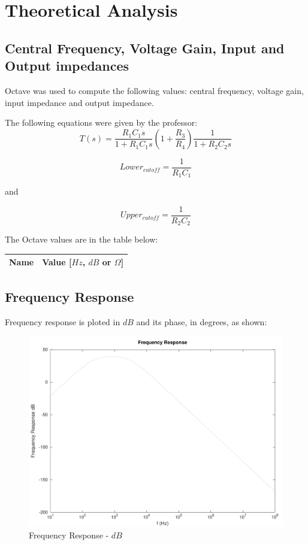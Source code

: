 \newpage

\section{Theoretical Analysis}
\label{sec:analysis}

\subsection{Central Frequency, Voltage Gain, Input and Output impedances}
Octave was used to compute the following values: central frequency, voltage gain, input impedance and output impedance. \par
The following equations were given by the professor:
\begin{equation}
    T(s) = \frac{R_1 C_1 s}{1+ R_1 C_1 s} (1+\frac{R_3}{R_4}) \frac{1}{1+ R_2 C_2 s}
\end{equation}\par
 \par
\begin{equation}
    Lower_{cutoff} = \frac{1}{R_1 C_1}
\end{equation}\par
and \par
\begin{equation}
    Upper_{cutoff} = \frac{1}{R_2 C_2}
\end{equation}\par
The Octave values are in the table below:

\begin{center}
  \begin{tabular}{ | c | c | }
    \hline    
    {\bf Name} & {\bf Value [$Hz$, $dB$ or $\Omega$]} \\ \hline
    
    \hline
  \end{tabular}
\end{center}

\subsection{Frequency Response}
Frequency response is ploted in $dB$ and its phase, in degrees, as shown:\par

\begin{figure}[H] \centering
\includegraphics[width=0.7\linewidth]{../mat/fresponse1.pdf}
\caption{Frequency Response - $dB$}
\label{fig:fresponse1}
\end{figure}


